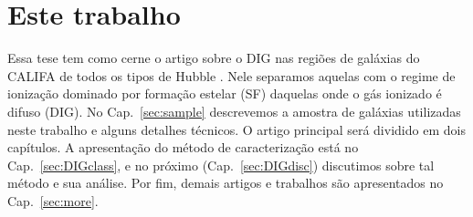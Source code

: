 \section{Este trabalho}
\label{sec:intro:estetrabalho}

Essa tese tem como cerne o artigo sobre o DIG nas regiões de galáxias do CALIFA de todos os tipos de Hubble \citep[][Apêndice \ref{apendice:DIGpaper0}]{Lacerda.etal.2018}. Nele separamos aquelas com o regime de ionização dominado por formação estelar (SF) daquelas onde o gás ionizado é difuso (DIG). No Cap.\ \ref{sec:sample} descrevemos a amostra de galáxias utilizadas neste trabalho e alguns detalhes técnicos. O artigo principal será dividido em dois capítulos. A apresentação do método de caracterização está no Cap.\ \ref{sec:DIGclass}, e no próximo (Cap.\ \ref{sec:DIGdisc}) discutimos sobre tal método e sua análise. Por fim, demais artigos e trabalhos são apresentados no Cap.\ \ref{sec:more}.

%
%
